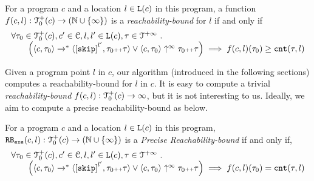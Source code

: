 %
%
\begin{defn}
 \label{def:rb}
 For a program ${c}$ and a location $l \in \mathtt{L}(c)$ in this program,
a function $f(c, l) : \mathcal{T}^{+}_0(c) \to (\mathbb{N} \cup \{\infty\})$ is a \emph{reachability-bound} for $l$ if and only if
\[
 \begin{array}{l}
 \forall \trace_0 \in \ftdom_0(c), c' \in \cdom, l, l' \in \progl(c), \trace \in \tdom \st 
 \\ \qquad
 \Big(
 \config{{c}, \trace_0} \to^{*} \config{\clabel{\eskip}^{l'}, \trace_0 \tracecat \trace} 
 \lor 
 \config{{c}, \trace_0} \uparrow^{\infty} \trace_0 \tracecat \trace 
 \Big)
 \implies f({c}, l)(\trace_0) \geq \counter(\trace, l) 
 \end{array}
 \]
\end{defn}
Given a program point $l$ in $c$, our algorithm (introduced in the following sections) computes a reachability-bound for $l$ in $c$.
It is easy to compute a trivial \emph{reachability-bound} $f(c, l): \mathcal{T}^{+}_0(c) \to \infty$, but it is not interesting to us.
Ideally, we aim to compute a precise reachability-bound as below.

\begin{defn}
 \label{def:exe_rb}
 For a program ${c}$ and a location $l \in \mathtt{L}(c)$ in this program,
$\mathtt{RB_{exe}}({c}, l): \mathcal{T}^{+}_0(c) \to (\mathbb{N} \cup \{\infty\})$ is a \emph{Precise Reachability-bound} if and only if,
\[
 \begin{array}{l}
 \forall \trace_0 \in \ftdom_0(c), c' \in \cdom, l, l' \in \progl(c), \trace \in \tdom \st 
 \\ \qquad
 \Big(
 \config{{c}, \trace_0} \to^{*} \config{\clabel{\eskip}^{l'}, \trace_0 \tracecat \trace} 
 \lor 
 \config{{c}, \trace_0} \uparrow^{\infty} \trace_0 \tracecat \trace 
 \Big)
 \implies f({c}, l)(\trace_0) = \counter(\trace, l) 
 \end{array}
 \]
\end{defn}

